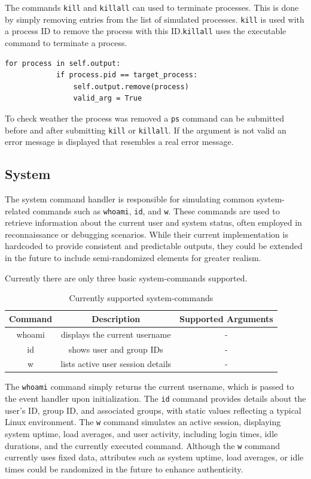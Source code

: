 The commands \texttt{kill} and \texttt{killall} can used to terminate processes\cite{kill}\cite{noauthor_killall1_2023}. This is done by simply removing entries from the list of simulated processes. \texttt{kill} is used with a process ID to remove the process with this ID\cite{kill}.\texttt{killall} uses the executable command to terminate a process\cite{noauthor_killall1_2023}.

\begin{lstlisting}
for process in self.output:
            if process.pid == target_process:
                self.output.remove(process)
                valid_arg = True
\end{lstlisting}

To check weather the process was removed a \texttt{ps} command can be submitted before and after submitting \texttt{kill} or \texttt{killall}. If the argument is not valid an error message is displayed that resembles a real error message.

\subsection{System}
The system command handler is responsible for simulating common system-related commands such as \texttt{whoami}, \texttt{id}, and \texttt{w}. These commands are used to retrieve information about the current user and system status, often employed in reconnaissance or debugging scenarios. While their current implementation is hardcoded to provide consistent and predictable outputs, they could be extended in the future to include semi-randomized elements for greater realism.

Currently there are only three basic system-commands supported.

\begin{table}[H]
    \centering
    \begin{tabular}{c|c|c}
        Command & Description & Supported Arguments\\
        \hline 
        whoami & displays the current username & -\\
        id & shows user and group IDs & - \\
        w & lists active user session details & -\\
    \end{tabular}
    \caption{Currently supported system-commands}
    \label{tab:my_label}
\end{table}

The \texttt{whoami} command simply returns the current username, which is passed to the event handler upon initialization. The \texttt{id} command provides details about the user’s ID, group ID, and associated groups, with static values reflecting a typical Linux environment. The \texttt{w} command simulates an active session, displaying system uptime, load averages, and user activity, including login times, idle durations, and the currently executed command. Although the \texttt{w} command currently uses fixed data, attributes such as system uptime, load averages, or idle times could be randomized in the future to enhance authenticity.

